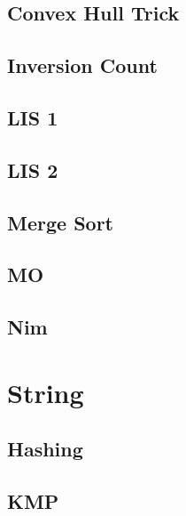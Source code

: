\documentclass[12pt, a4paper, twoside]{article}
\begin{document}
\subsection{Convex Hull Trick}


\subsection{Inversion Count}


\subsection{LIS 1}


\subsection{LIS 2}


\subsection{Merge Sort}


\subsection{MO}


\subsection{Nim}




%
%

\section{String}

\subsection{Hashing}


\subsection{KMP}

\end{document}
